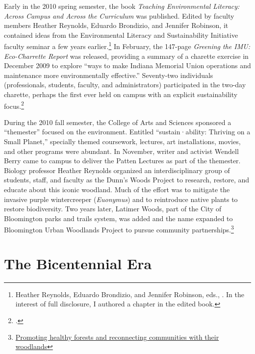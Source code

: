 \documentclass[
  american,
  letterpaper,
]{scrreprt}
\begin{document}
Early in the 2010 spring semester, the book \emph{Teaching Environmental
Literacy: Across Campus and Across the Curriculum} was published. Edited
by faculty members Heather Reynolds, Eduardo Brondizio, and Jennifer
Robinson, it contained ideas from the Environmental Literacy and
Sustainability Initiative faculty seminar a few years
earlier.\footnote{Heather Reynolds, Eduardo Brondizio, and Jennifer
  Robinson, eds., . In the interest of
  full disclosure, I authored a chapter in the edited book.} In
February, the 147-page \emph{Greening the IMU: Eco-Charrette Report} was
released, providing a summary of a charette exercise in December 2009 to
explore ``ways to make Indiana Memorial Union operations and maintenance
more environmentally effective.'' Seventy-two individuals
(professionals, students, faculty, and administrators) participated in
the two-day charette, perhaps the first ever held on campus with an
explicit sustainability focus.\footnote{.}

During the 2010 fall semester, the College of Arts and Sciences
sponsored a ``themester'' focused on the environment. Entitled
``sustain·ability: Thriving on a Small Planet,'' specially themed
coursework, lectures, art installations, movies, and other programs were
abundant. In November, writer and activist Wendell Berry came to campus
to deliver the Patten Lectures as part of the themester. Biology
professor Heather Reynolds organized an interdisciplinary group of
students, staff, and faculty as the Dunn's Woods Project to research,
restore, and educate about this iconic woodland. Much of the effort was
to mitigate the invasive purple wintercreeper (\emph{Euonymus}) and to
reintroduce native plants to restore biodiversity. Two years later,
Latimer Woods, part of the City of Bloomington parks and trails system,
was added and the name expanded to Bloomington Urban Woodlands Project
to pursue community partnerships.\footnote{\href{https://sustain.iu.edu/buwp.html}{Promoting
  healthy forests and reconnecting communities with their woodlands}}

\section{The Bicentennial Era}\label{the-bicentennial-era}
\end{document}
